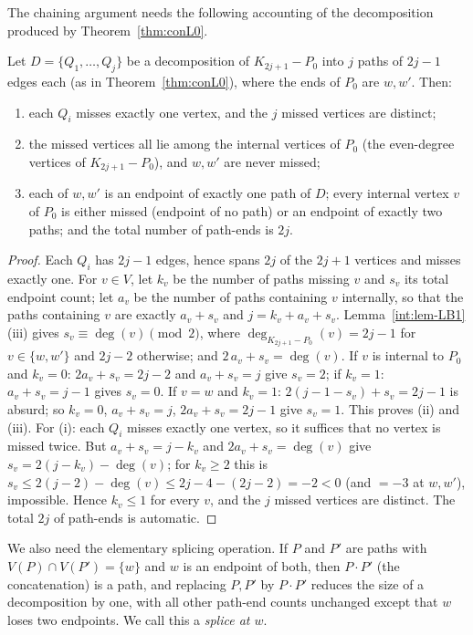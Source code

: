 The chaining argument needs the following accounting of the decomposition
produced by Theorem~\ref{thm:conL0}.

\begin{lemma}\label{lem:conslots}
Let $D=\{Q_1,\dots,Q_j\}$ be a decomposition of $K_{2j+1}-P_0$ into $j$
paths of $2j-1$ edges each (as in Theorem~\ref{thm:conL0}), where the ends
of $P_0$ are $w,w'$. Then:
\begin{enumerate}[label={\rm(\roman*)},leftmargin=2em]
\item each $Q_i$ misses exactly one vertex, and the $j$ missed vertices
are distinct;
\item the missed vertices all lie among the internal vertices of $P_0$ (the
even-degree vertices of $K_{2j+1}-P_0$), and $w,w'$ are never missed;
\item each of $w,w'$ is an endpoint of exactly one path of $D$; every
internal vertex $v$ of $P_0$ is either missed (endpoint of no path) or an
endpoint of exactly two paths; and the total number of path-ends is $2j$.
\end{enumerate}
\end{lemma}

\begin{proof}
Each $Q_i$ has $2j-1$ edges, hence spans $2j$ of the $2j+1$ vertices and
misses exactly one. For $v\in V$, let $k_v$ be the number of paths missing
$v$ and $s_v$ its total endpoint count; let $a_v$ be the number of paths
containing $v$ internally, so that the paths containing $v$ are exactly
$a_v+s_v$ and $j=k_v+a_v+s_v$. Lemma~\ref{int:lem-LB1}(iii) gives
$s_v\equiv\deg(v)\pmod 2$, where $\deg_{K_{2j+1}-P_0}(v)=2j-1$ for
$v\in\{w,w'\}$ and $2j-2$ otherwise; and $2\,a_v+s_v=\deg(v)$. If $v$ is
internal to $P_0$ and $k_v=0$: $2a_v+s_v=2j-2$ and $a_v+s_v=j$ give
$s_v=2$; if $k_v=1$: $a_v+s_v=j-1$ gives $s_v=0$. If $v=w$ and $k_v=1$:
$2(j-1-s_v)+s_v=2j-1$ is absurd; so $k_v=0$, $a_v+s_v=j$,
$2a_v+s_v=2j-1$ give $s_v=1$. This proves (ii) and (iii). For (i): each
$Q_i$ misses exactly one vertex, so it suffices that no vertex is missed
twice. But $a_v+s_v=j-k_v$ and $2a_v+s_v=\deg(v)$ give
$s_v=2(j-k_v)-\deg(v)$; for $k_v\ge2$ this is
$s_v\le 2(j-2)-\deg(v)\le 2j-4-(2j-2)=-2<0$ (and $=-3$ at $w,w'$),
impossible. Hence $k_v\le1$ for every $v$, and the $j$ missed vertices are
distinct. The total $2j$ of path-ends is automatic.
\end{proof}

We also need the elementary splicing operation. If $P$ and $P'$ are paths
with $V(P)\cap V(P')=\{w\}$ and $w$ is an endpoint of both, then
$P\cdot P'$ (the concatenation) is a path, and replacing $P,P'$ by
$P\cdot P'$ reduces the size of a decomposition by one, with all other
path-end counts unchanged except that $w$ loses two endpoints. We call
this a \emph{splice at $w$}.

